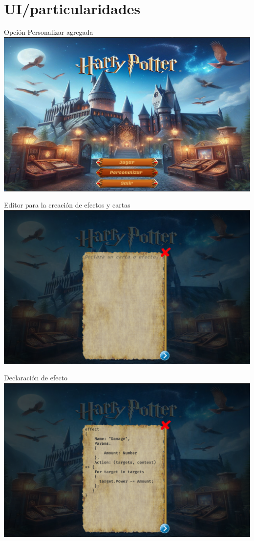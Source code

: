 \documentclass[a4paper, 12pt]{beamer}
\begin{document}
\section{UI/particularidades}
\begin{frame}{\textcolor{plata}{Opción Personalizar agregada}}
\includegraphics[scale = 0.2]{images/image10.png}
\end{frame}

\begin{frame}{\textcolor{plata}{Editor para la creación de efectos y cartas}}
\includegraphics[scale = 0.2]{images/image11.png}
\end{frame}

\begin{frame}{\textcolor{plata}{Declaración de efecto}}
\includegraphics[scale = 0.2]{images/image12.png}
\end{frame}
\end{document}
